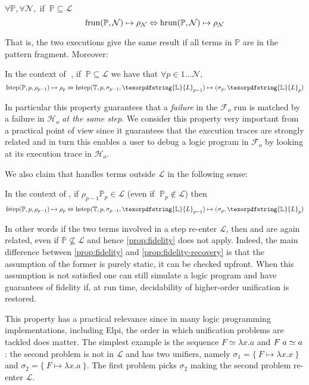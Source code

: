\documentclass[sigconf,natbib=false,review]{acmart}
\newcommand{\appsep}{\ensuremath{\textcolor{lightgray}{\cdot}}}
\newcommand{\UnifRel}{\ensuremath{\simeq}}
\newcommand{\llambda}{\ensuremath{\mathcal{L}}\xspace}
\newcommand{\Fo}{\texorpdfstring{\ensuremath{\mathcal{F}_{\!o}\xspace}}{Fo}} %
\newcommand{\Ho}{\texorpdfstring{\ensuremath{\mathcal{H}_o}\xspace}{Ho}}
\newcommand{\linkStore}{\texorpdfstring{\ensuremath{\mathbb{L}}\xspace}{L}}
\newcommand{\foUnifPb}{\ensuremath{\mathbb{P}}\xspace}
\newcommand{\hoUnifPb}{\ensuremath{\mathbb{T}}\xspace}
\begin{document}
\begin{proposition}[Simulation]\label{prop:simulation}
$\forall \foUnifPb, \forall \mathcal{N},$ if $~\foUnifPb \subseteq \llambda$
$$
  \runF{\foUnifPb}{\mathcal{N}}{\rho}
  \Leftrightarrow
  \runH{\foUnifPb}{\mathcal{N}}{\rho}
$$
\end{proposition}

\noindent
That is, the two executions give the same result if all terms in
\foUnifPb are in the pattern fragment. Moreover:

\begin{proposition}\label{prop:fidelity}
In the context of$\;$ \hrun, if $~\foUnifPb \subseteq \llambda$ we have that
$\forall p \in 1 \ldots \mathcal{N},$
$$
\stepF{\foUnifPb}{p}{\rho_{p-1}}{\rho_p}
\Leftrightarrow
\stepH{\hoUnifPb}{p}{\sigma_{p-1}}{\linkStore_{p-1}}{\sigma_p}{\linkStore_p}
$$
\end{proposition}
\noindent
In particular this property guarantees that a \emph{failure} in the \Fo{} run
is matched by a failure in \Ho{} \emph{at the same step}. We consider this
property very important from a practical point of view since it guarantees
that the execution traces are strongly related and in turn this enables a user
to debug a logic program in \Fo{} by looking at its execution trace in
\Ho{}.

We also claim that \hrun handles terms outside \llambda in the following sense:

\begin{proposition}\label{prop:fidelity-recovery} 
In the context of \hrun, if 
$\rho_{p-1} \foUnifPb_{p} \in \llambda$ 
(even if $\;\foUnifPb_{p} \not\in \llambda$)
then
$$
\stepF{\foUnifPb}{p}{\rho_{p-1}}{\rho_p} \Leftrightarrow
\stepH{\hoUnifPb}{p}{\sigma_{p-1}}{\linkStore_{p-1}}{\sigma_{p}}{\linkStore_p}
$$
\end{proposition}
  
In other words if the two terms involved in a step
re-enter \llambda, then \hstep and \fstep are again related, even if
$\foUnifPb \not\subseteq \llambda$ and hence \cref{prop:fidelity} does not apply.
Indeed, the main difference between \cref{prop:fidelity} and \cref{prop:fidelity-recovery}
is that the assumption of the former is purely static, it can be checked upfront. 
When this assumption is not satisfied one can still simulate a logic program and
have guarantees of fidelity if, at run time, decidability of higher-order
unification is restored.

This property has a practical relevance since in many logic programming
implementations, including Elpi, the order in which unification problems
are tackled does matter.
The simplest example is the sequence $F \UnifRel \lambda x.a$ and
$F \appsep a \UnifRel a$: the second problem is not in \llambda and has two
unifiers, namely $\sigma_1 = \{~ F \mapsto \lambda x.x ~\}$ and
$\sigma_2 = \{~ F \mapsto \lambda x.a ~\}$. The first problem picks $\sigma_2$
making the second problem re-enter \llambda.
\end{document}
